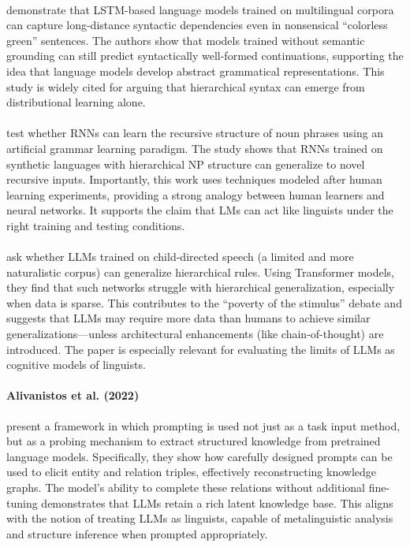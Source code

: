 \paragraph{} \citet{gulordava2018colorless} demonstrate that LSTM-based language models trained on multilingual corpora can capture long-distance syntactic dependencies even in nonsensical ``colorless green'' sentences. The authors show that models trained without semantic grounding can still predict syntactically well-formed continuations, supporting the idea that language models develop abstract grammatical representations. This study is widely cited for arguing that hierarchical syntax can emerge from distributional learning alone.

\paragraph{} \citet{matusevych2022trees} test whether RNNs can learn the recursive structure of noun phrases using an artificial grammar learning paradigm. The study shows that RNNs trained on synthetic languages with hierarchical NP structure can generalize to novel recursive inputs. Importantly, this work uses techniques modeled after human learning experiments, providing a strong analogy between human learners and neural networks. It supports the claim that LMs can act like linguists under the right training and testing conditions.

\paragraph{} \citet{yedetore2023stimulus} ask whether LLMs trained on child-directed speech (a limited and more naturalistic corpus) can generalize hierarchical rules. Using Transformer models, they find that such networks struggle with hierarchical generalization, especially when data is sparse. This contributes to the ``poverty of the stimulus'' debate and suggests that LLMs may require more data than humans to achieve similar generalizations---unless architectural enhancements (like chain-of-thought) are introduced. The paper is especially relevant for evaluating the limits of LLMs as cognitive models of linguists.

\paragraph{Alivanistos et al. (2022)}
\citet{alivanistos2022prompting} present a framework in which prompting is used not just as a task input method, but as a probing mechanism to extract structured knowledge from pretrained language models. Specifically, they show how carefully designed prompts can be used to elicit entity and relation triples, effectively reconstructing knowledge graphs. The model's ability to complete these relations without additional fine-tuning demonstrates that LLMs retain a rich latent knowledge base. This aligns with the notion of treating LLMs as linguists, capable of metalinguistic analysis and structure inference when prompted appropriately.

